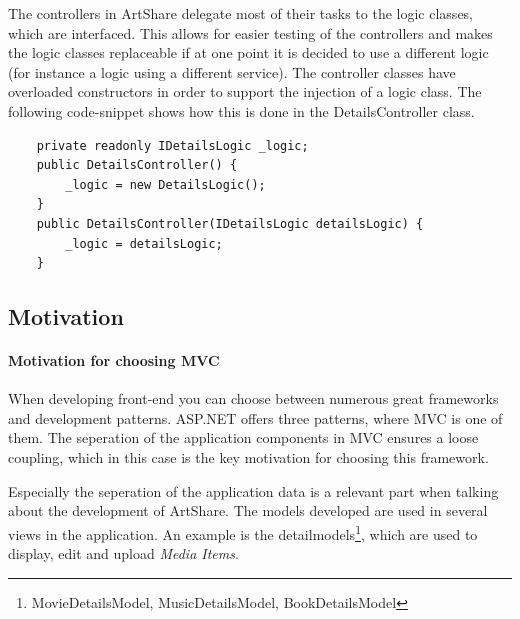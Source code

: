 \documentclass[../report.tex]{subfiles}
\begin{document}
The controllers in ArtShare delegate most of their tasks to the logic classes, which are interfaced. This allows for easier testing of the controllers and makes the logic classes replaceable if at one point it is decided to use a different logic (for instance a logic using a different service). The controller classes have overloaded constructors in order to support the injection of a logic class. The following code-snippet shows how this is done in the DetailsController class.

\begin{lstlisting}
	private readonly IDetailsLogic _logic;
	public DetailsController() {
		_logic = new DetailsLogic();
	}
	public DetailsController(IDetailsLogic detailsLogic) {
		_logic = detailsLogic;
	}
\end{lstlisting}




\subsection{Motivation}

\paragraph{Motivation for choosing MVC}
When developing front-end you can choose between numerous great frameworks and development patterns. ASP.NET offers three patterns, where MVC is one of them. The seperation of the application components in MVC ensures a loose coupling, which in this case is the key motivation for choosing this framework.

Especially the seperation of the application data is a relevant part when talking about the development of ArtShare. The models developed are used in several views in the application. An example is the detailmodels\footnote{MovieDetailsModel, MusicDetailsModel, BookDetailsModel}, which are used to display, edit and upload \textit{Media Items}.
\end{document}
